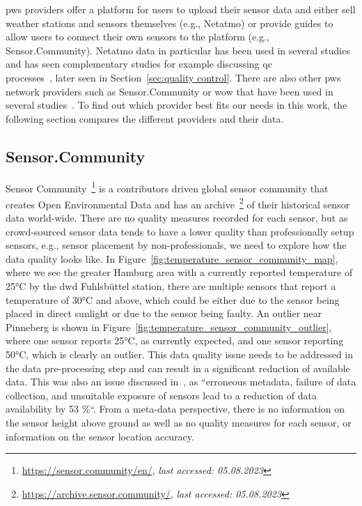 \gls{pws} providers offer a platform for users to upload their sensor data and either sell weather stations and sensors themselves (e.g., Netatmo) or provide guides to allow users to connect their own sensors to the platform (e.g., Sensor.Community). Netatmo data in particular has been used in several studies~\cite{meier2017crowdsourcing, hahn2022observations, venter2020hyperlocal, zumwald2021mapping} and has seen complementary studies for example discussing \gls{qc}\\
processes~\cite{fenner2021crowdqc+}, later seen in Section~\ref{sec:quality control}. There are also other \gls{pws} network providers such as Sensor.Community or \gls{wow} that have been used in several studies~\cite{ho2014mapping}. To find out which provider best fits our needs in this work, the following section compares the different providers and their data.

\subsection{Sensor.Community}

Sensor Community~\footnote{\url{https://sensor.community/en/}, \textit{last accessed: 05.08.2023}} is a contributors driven global sensor community that creates Open Environmental Data and has an archive~\footnote{\url{https://archive.sensor.community/}, \textit{last accessed: 05.08.2023}} of their historical sensor data world-wide. There are no quality measures recorded for each sensor, but as crowd-sourced sensor data tends to have a lower quality than professionally setup sensors, e.g., sensor placement by non-professionals, we need to explore how the data quality looks like.
In Figure~\ref{fig:temperature_sensor_community_map}, where we see the greater Hamburg area with a currently reported temperature of 25°C by the \gls{dwd} Fuhlsbüttel station, there are multiple sensors that report a temperature of 30°C and above, which could be either due to the sensor being placed in direct sunlight or due to the sensor being faulty. An outlier near Pinneberg is shown in Figure~\ref{fig:temperature_sensor_community_outlier}, where one sensor reports 25°C, as currently expected, and one sensor reporting 50°C, which is clearly an outlier. This data quality issue needs to be addressed in the data pre-processing step and can result in a significant reduction of available data. This was also an issue discussed in~\cite{meier2017crowdsourcing}, as ``erroneous metadata, failure of data collection, and unsuitable exposure of sensors lead to a reduction of data availability by 53 \%``.
From a meta-data perspective, there is no information on the sensor height above ground as well as no quality measures for each sensor, or information on the sensor location accuracy.

